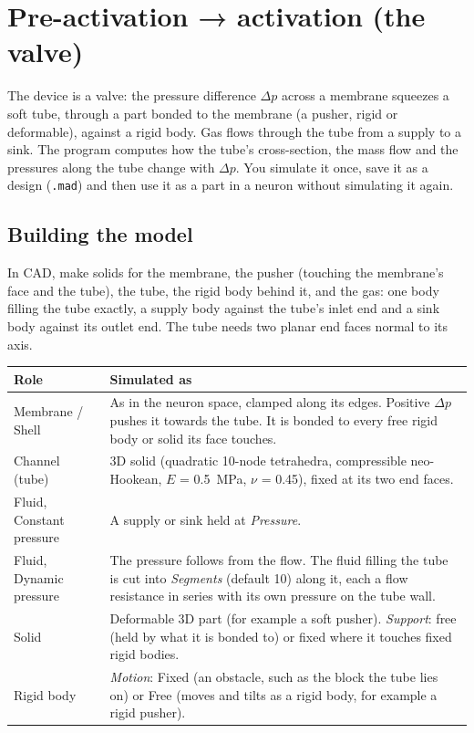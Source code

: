 \documentclass[11pt,a4paper]{article}
\newcommand{\code}[1]{\texttt{#1}}
\begin{document}
\section{Pre-activation → activation (the valve)}
\label{sec:activation}

The device is a valve: the pressure difference $\Delta p$ across a membrane squeezes a soft tube, through a part
bonded to the membrane (a pusher, rigid or deformable), against a rigid body. Gas flows through the tube from a
supply to a sink. The program computes how the tube's cross-section, the mass flow and the pressures along the
tube change with $\Delta p$. You simulate it once, save it as a design (\code{.mad}) and then use it as a part in a
neuron without simulating it again.

\subsection{Building the model}

In CAD, make solids for the membrane, the pusher (touching the membrane's face and the tube), the tube, the rigid
body behind it, and the gas: one body filling the tube exactly, a supply body against the tube's inlet end and a
sink body against its outlet end. The tube needs two planar end faces normal to its axis.

\begin{center}
\begin{tabularx}{\textwidth}{@{}l X@{}}
\toprule
Role & Simulated as \\
\midrule
Membrane / Shell & As in the neuron space, clamped along its edges. Positive $\Delta p$ pushes it towards the tube.
  It is bonded to every free rigid body or solid its face touches. \\
Channel (tube) & 3D solid (quadratic 10-node tetrahedra, compressible neo-Hookean, $E$ = 0.5~MPa,
  $\nu$ = 0.45), fixed at its two end faces. \\
Fluid, Constant pressure & A supply or sink held at \emph{Pressure}. \\
Fluid, Dynamic pressure & The pressure follows from the flow. The fluid filling the tube is cut into
  \emph{Segments} (default 10) along it, each a flow resistance in series with its own pressure on the tube wall. \\
Solid & Deformable 3D part (for example a soft pusher). \emph{Support}: free (held by what it is bonded to) or
  fixed where it touches fixed rigid bodies. \\
Rigid body & \emph{Motion}: Fixed (an obstacle, such as the block the tube lies on) or Free (moves and tilts as a
  rigid body, for example a rigid pusher). \\
\bottomrule
\end{tabularx}
\end{center}
\end{document}
